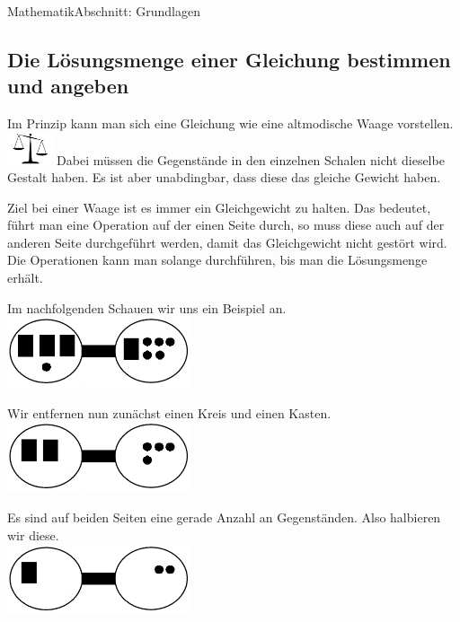 \documentclass[11pt,twocolumn,oneside,openany,headings=optiontotoc,11pt,numbers=noenddot]{article}
\begin{document}
\begin{worksheet}{}{Mathematik}{Abschnitt: Grundlagen}
		\subsection{Die Lösungsmenge einer Gleichung bestimmen und angeben}
		Im Prinzip kann man sich eine Gleichung wie eine altmodische Waage vorstellen.\\
		\includegraphics[width=0.1\textwidth]{../99_Bilder/waage.jpg} Dabei müssen die Gegenstände in den einzelnen Schalen nicht dieselbe Gestalt haben. Es ist aber unabdingbar, dass diese das gleiche Gewicht haben.\\
		\par\bigskip\noindent
		Ziel bei einer Waage ist es immer ein Gleichgewicht zu halten. Das bedeutet, führt man eine Operation auf der einen Seite durch, so muss diese auch auf der anderen Seite durchgeführt werden, damit das Gleichgewicht nicht gestört wird.\\
		Die Operationen kann man solange durchführen, bis man die Lösungsmenge erhält.\\
		\begin{framed}
			\noindent
			Im nachfolgenden Schauen wir uns ein Beispiel an.\\
			\centering
			\includegraphics[width=0.4\textwidth]{../99_Bilder/L.jpg}\\
			\raggedright
			Wir entfernen nun zunächst einen Kreis und einen Kasten.\\
			\centering
			\includegraphics[width=0.4\textwidth]{../99_Bilder/L1.jpg}\\
			\raggedright
			Es sind auf beiden Seiten eine gerade Anzahl an \glqq{}Gegenständen\grqq{}. Also halbieren wir diese.\\
			\centering
			\includegraphics[width=0.4\textwidth]{../99_Bilder/L2.jpg}\\

\end{framed}
\end{worksheet}
\end{document}
